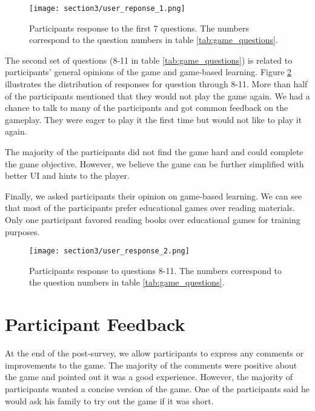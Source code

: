 \begin{figure}[!ht]
    \centering
    \texttt{[image: section3/user\_reponse\_1.png]}
    \caption{Participants response to the first 7 questions. The numbers correspond to the question numbers in table \ref{tab:game_questions}.}
    \label{fig:phishing_game_questions_1}
\end{figure}

The second set of questions (8-11 in table \ref{tab:game_questions}) is related to participants' general opinions of the game and game-based learning. Figure \ref{fig:phishing_game_questions_2} illustrates the distribution of responses for question through 8-11.  More than half of the participants mentioned that they would not play the game again. We had a chance to talk to many of the participants and got common feedback on the gameplay. They were eager to play it the first time but would not like to play it again.

The majority of the participants did not find the game hard and could complete the game objective. However, we believe the game can be further simplified with better UI and hints to the player.

Finally, we asked participants their opinion on game-based learning. We can see that most of the participants prefer educational games over reading materials. Only one participant favored reading books over educational games for training purposes.


\begin{figure}[!ht]
    \centering
    \texttt{[image: section3/user\_response\_2.png]}
    \caption{Participants response to questions 8-11. The numbers correspond to the question numbers in table \ref{tab:game_questions}.}
    \label{fig:phishing_game_questions_2}
\end{figure}


\section{Participant Feedback}
At the end of the post-survey, we allow participants to express any comments or improvements to the game. The majority of the comments were positive about the game and pointed out it was a good experience. However, the majority of participants wanted a concise version of the game. One of the participants said he would ask his family to try out the game if it was short.

